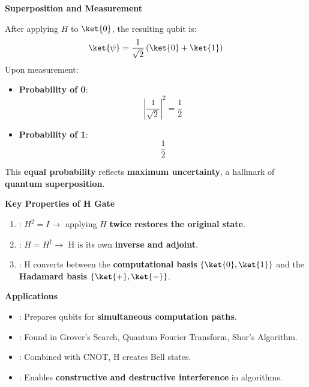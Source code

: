 \highspace
\begin{flushleft}
    \textcolor{Green3}{ \textbf{Superposition and Measurement}}
\end{flushleft}
After applying $H$ to $\ket{0}$, the resulting qubit is:
\begin{equation*}
    \ket{\psi} = \dfrac{1}{\sqrt{2}}\left(\ket{0} + \ket{1}\right)
\end{equation*}
Upon measurement:
\begin{itemize}
    \item \textbf{Probability of 0}:
    \begin{equation*}
        \left|\dfrac{1}{\sqrt{2}}\right|^{2} = \dfrac{1}{2}
    \end{equation*}
    \item \textbf{Probability of 1}:
    \begin{equation*}
        \dfrac{1}{2}
    \end{equation*}
\end{itemize}
This \textbf{equal probability} reflects \textbf{maximum uncertainty}, a hallmark of \textbf{quantum superposition}.

\highspace
\begin{flushleft}
    \textcolor{Green3}{ \textbf{Key Properties of H Gate}}
\end{flushleft}
\begin{enumerate}
    \item {}: $H^{2} = I \rightarrow$ applying $H$ \textbf{twice restores the original state}.
    \item {}: $H = H^{\dagger} \rightarrow$ H is its own \textbf{inverse and adjoint}.
    \item {}: H converts between the \textbf{computational basis} $\left\{\ket{0}, \ket{1}\right\}$ and the \textbf{Hadamard basis} $\left\{\ket{+}, \ket{-}\right\}$.
\end{enumerate}

\highspace
\begin{flushleft}
    \textcolor{Green3}{ \textbf{Applications}}
\end{flushleft}
\begin{itemize}
    \item {}: Prepares qubits for \textbf{simultaneous computation paths}.
    \item {}: Found in Grover's Search, Quantum Fourier Transform, Shor's Algorithm.
    \item {}: Combined with CNOT, H creates Bell states.
    \item {}: Enables \textbf{constructive and destructive interference} in algorithms.
\end{itemize}
